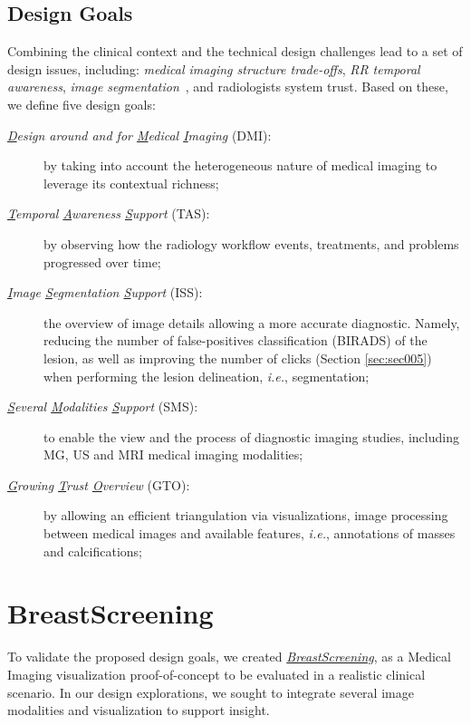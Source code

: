 \subsection{Design Goals}

Combining the clinical context and the technical design challenges lead to a set of design issues, including: \textit{medical imaging structure trade-offs}, \textit{RR temporal awareness}, \textit{image segmentation}~\cite{8736792}, and radiologists system trust.
Based on these, we define five design goals:
\begin{description}
\item[{\it \underline{D}esign around and for \underline{M}edical \underline{I}maging} (DMI):] by taking into account the heterogeneous nature of medical imaging to leverage its contextual richness;
\item[{\it \underline{T}emporal \underline{A}wareness \underline{S}upport} (TAS):] by observing how the radiology workflow events, treatments, and problems progressed over time;
\item[{\it \underline{I}mage \underline{S}egmentation \underline{S}upport} (ISS):] the overview of image details allowing a more accurate diagnostic. Namely, reducing the number of false-positives classification (BIRADS) of the lesion, as well as improving the number of clicks (Section \ref{sec:sec005}) when performing the lesion delineation, {\em i.e.}, segmentation;
\item[{\it\underline{S}everal \underline{M}odalities \underline{S}upport} (SMS):] to enable the view and the process of diagnostic imaging studies, including MG, US and MRI medical imaging modalities;
\item[{\it\underline{G}rowing \underline{T}rust \underline{O}verview} (GTO):] by allowing an efficient triangulation via visualizations, image processing between medical images and available features, {\em i.e.}, annotations of masses and calcifications;
\end{description}
 \section{BreastScreening}
\label{sec:sec004}
To validate the proposed design goals, we created \href{https://breastscreening.github.io/}{{\it BreastScreening}}, as a Medical Imaging visualization proof-of-concept to be evaluated in a realistic clinical scenario.
In our design explorations, we sought to integrate several image modalities and visualization to support insight.

